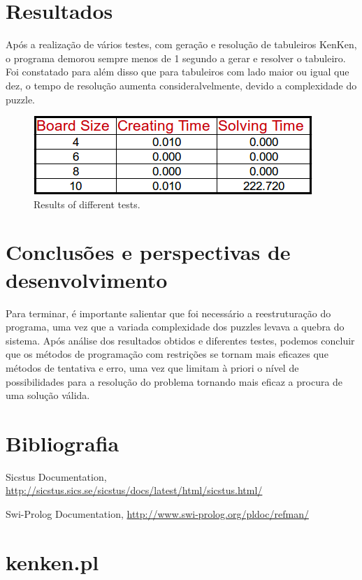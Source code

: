 \documentclass[runningheads,a4paper]{llncs}
\begin{document}
\section{Resultados}
Após a realização de vários testes, com geração e resolução de tabuleiros KenKen, o programa demorou sempre menos de 1 segundo a gerar e resolver o tabuleiro. Foi constatado para além disso que para tabuleiros com lado maior ou igual que dez, o tempo de resolução aumenta consideralvelmente, devido a complexidade do puzzle.
\begin{figure}
\centering
\includegraphics[scale=0.8]{table}
\caption{Results of different tests.}
\label{fig:example}
\end{figure}

\FloatBarrier

\section{Conclusões e perspectivas de desenvolvimento}
Para terminar, é importante salientar que foi necessário a reestruturação do programa, uma vez que a variada complexidade dos puzzles levava a quebra do sistema.
Após análise dos resultados obtidos e diferentes testes, podemos concluir que os métodos de programação com restrições se tornam mais eficazes que métodos de tentativa e erro, uma vez que limitam à priori o nível de possibilidades para a resolução do problema tornando mais eficaz a procura de uma solução válida.

\section{Bibliografia}

\begin{thebibliography}{4}

 Sicstus Documentation, \url{http://sicstus.sics.se/sicstus/docs/latest/html/sicstus.html/}

 Swi-Prolog Documentation, \url{http://www.swi-prolog.org/pldoc/refman/}

\end{thebibliography}

\newpage
\appendix
\section{kenken.pl}
\lstset{
language=Prolog,
numbers=left,
frame=single,
breaklines=true,
}


\end{document}
